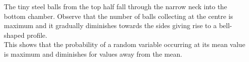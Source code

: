 The tiny steel balls from the top half fall through the narrow neck into the bottom chamber. Observe that the number of balls collecting at the centre is maximum and it gradually diminishes towards the sides giving rise to a bell-shaped profile.
 \\ This shows that the probability of a random variable occurring at its mean value is maximum and diminishes for values away from the mean.
 \cite{enwiki:1026848272}
 \cite{article}
